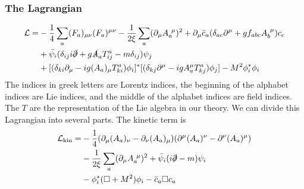 \documentclass[a4paper]{book}
\theoremstyle{definition}
\theoremstyle{remark}
\begin{document}
\subsubsection{The Lagrangian}
\begin{equation}
        \begin{aligned}
            \mathcal L =& -\frac{1}{4} \sum_{a} (F_a)_{\mu\nu}(F_a)^{\mu\nu} - \frac{1}{2\xi}\sum_a (\partial_\mu A_a^{~\mu})^2 + \partial_\mu \bar{c}_a (\delta_{ac}\partial^{\mu} + gf_{abc}A_b^{~\mu})c_c \\
            &+ \bar{\psi_i}(\delta_{ij} i\slashed{\partial} + g\slashed{A}_aT_{ij}^a - m\delta_{ij})\psi_j  \\
            &+ [(\delta_{ki}\partial_\mu - ig (A_a)_\mu T^a_{ki})\phi_i]^*[(\delta_{kj}\partial^\mu - ig A^\mu_a T^a_{kj})\phi_j] - M^2 \phi^*_i\phi_i
        \end{aligned}
\end{equation}
The indices in greek letters are Lorentz indices, the beginning of the alphabet indices are Lie indices, and the middle of the alphabet indices are field indices. The $T$ are the representation of the Lie algebra in our theory. We can divide this Lagrangian into several parts. The kinetic term is 
\begin{equation}
    \begin{aligned}
        \mathcal L_{\text{kin}} =& -\frac{1}{4}(\partial_\mu (A_a)_\nu - \partial_\nu (A_a)_\mu)(\partial^\mu (A_a)^\nu - \partial^\nu (A_a)^\mu) \\
        &-\frac{1}{2\xi}\sum_a (\partial_\mu A_a^{~\mu})^2 + \bar \psi_i (i \slashed{\partial} - m)\psi_i \\ 
        &- \phi^*_i (\square + M^2)\phi_i - \bar c_a \square c_a 
    \end{aligned}
\end{equation}
\end{document}
